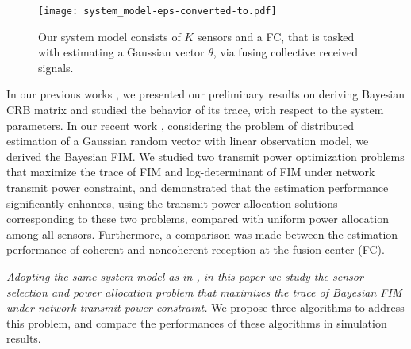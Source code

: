 \documentclass[conference]{IEEEtran}
\newcommand{\blue}{\color{blue}}
\begin{document}
%
\begin{figure*}[t]
	\centering
	\texttt{[image: system\_model-eps-converted-to.pdf]}
	\vspace{-0.1cm}
	\caption{Our system model consists of $K$ sensors and a FC, that is tasked with estimating a Gaussian vector {\boldmath$\theta$}, via fusing collective received signals.}
	\label{system-model}
	\vspace{-.5cm}
\end{figure*}
%
In our previous works \cite{Shirazi_PIMRC2014}\cite{Shirazi_asilomar2014}, we presented our preliminary results on deriving Bayesian CRB matrix and studied the behavior of its trace, with respect to the system parameters. In our recent work \cite{Shirazi_Vosoughi_journal_2017}, considering the problem of distributed estimation of a Gaussian random vector with linear observation model, we derived the Bayesian FIM. We studied two transmit power optimization problems that maximize the trace of FIM and log-determinant of FIM under network transmit power constraint, and demonstrated that the estimation performance significantly enhances, using the transmit power allocation solutions corresponding to these two problems, compared with uniform power allocation among all sensors. Furthermore, a comparison was made between the estimation performance of coherent and noncoherent reception at the fusion center (FC).

{\it Adopting the same system model as in \cite{Shirazi_Vosoughi_journal_2017}, in this paper we study the sensor selection and power allocation problem that maximizes the trace of Bayesian FIM under network transmit power constraint.} We propose three algorithms to address this problem, and compare the performances of these algorithms in simulation results. 
\end{document}
